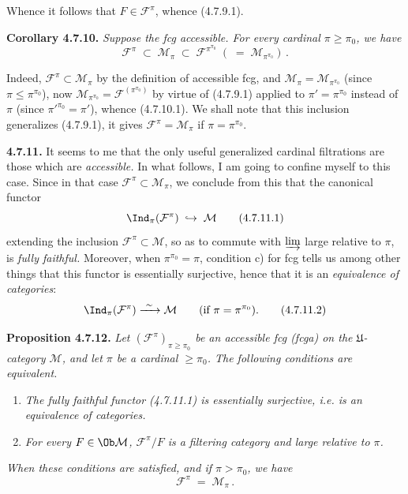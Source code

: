 Whence it follows that $F\in\mathcal{F}^{\pi}$, whence (4.7.9.1).

\textbf{Corollary 4.7.10.} \textit{Suppose the fcg accessible. For every cardinal $\pi\geqslant\pi_0$, we have}
\[
\mathcal{F}^{\pi} \;\subset\; \mathcal{M}_\pi \;\subset\; \mathcal{F}^{\pi^{\pi_0}} \; ( \;=\; \mathcal{M}_{\pi^{\pi_0}}) \, . \tag*{(4.7.10.1)}
\]

Indeed, $\mathcal{F}^{\pi}\subset\mathcal{M}_\pi$ by the definition of accessible fcg, and $\mathcal{M}_\pi=\mathcal{M}_{\pi^{\pi_0}}$ (since $\pi\leqslant\pi^{\pi_0}$), now $\mathcal{M}_{\pi^{\pi_0}}=\mathcal{F}^{(\pi^{\pi_0})}$ by virtue of (4.7.9.1) applied to $\pi'=\pi^{\pi_0}$ instead of $\pi$ (since $\pi'^{\pi_0}=\pi'$), whence (4.7.10.1). We shall note that this inclusion generalizes (4.7.9.1), it gives $\mathcal{F}^{\pi}=\mathcal{M}_\pi$ if $\pi=\pi^{\pi_0}$.

\textbf{4.7.11.} It seems to me that the only useful generalized cardinal filtrations are those which are \textit{accessible.} In what follows, I am going to confine myself to this case. Since in that case $\mathcal{F}^{\pi}\subset\mathcal{M}_\pi$, we conclude from this
that the canonical functor
\[
\Ind_\pi(\mathcal{F}^{\pi}) \;\hookrightarrow\; \mathcal{M} \tag*{(4.7.11.1)}
\]
extending the inclusion $\mathcal{F}^{\pi}\subset\mathcal{M}$, so as to commute with $\varinjlim$ large relative to $\pi$, is \textit{fully faithful.} Moreover, when $\pi^{\pi_0}=\pi$, condition c) for fcg tells us among other things that this functor is essentially surjective, hence that it is an \textit{equivalence of categories}:
\[
\Ind_\pi(\mathcal{F}^{\pi}) \xrightarrow{\ \sim\ } \mathcal{M} \qquad (\text{if } \pi=\pi^{\pi_0}). \tag*{(4.7.11.2)}
\]

\textbf{Proposition 4.7.12.} \textit{Let $(\mathcal{F}^{\pi})_{\pi\geqslant\pi_0}$ be an accessible fcg (fcga) on the $\mathfrak{U}$-category $\mathcal{M}$, and let $\pi$ be a cardinal $\geqslant\pi_0$. The following conditions are equivalent.}
\begin{enumerate}[label=\textit{\alph*)}]
\item \textit{The fully faithful functor (4.7.11.1) is essentially surjective, i.e. is an equivalence of categories.}
\item \textit{For every $F\in\Ob\mathcal{M}$, $\mathcal{F}^{\pi}/F$ is a filtering category and large relative to $\pi$.}
\end{enumerate}

\noindent{}
\textit{When these conditions are satisfied, and if $\pi>\pi_0$, we have}
\[
\mathcal{F}^{\pi} \;=\; \mathcal{M}_\pi \, . \tag*{(4.7.12.1)}
\]

